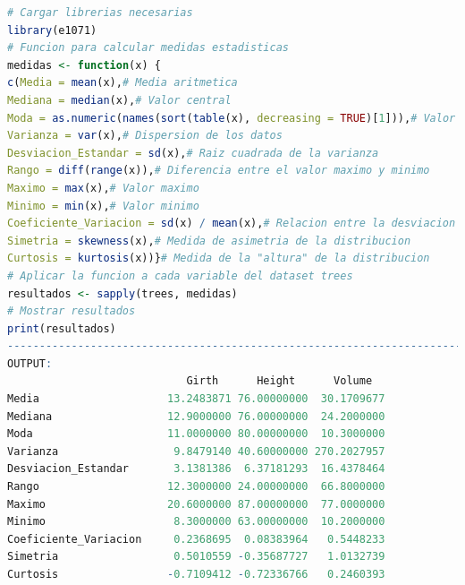 \documentclass{article}
\begin{document}
\begin{lstlisting}[language=R, caption=Medidas]
# Cargar librerias necesarias
library(e1071)  
# Funcion para calcular medidas estadisticas
medidas <- function(x) {
c(Media = mean(x),# Media aritmetica
Mediana = median(x),# Valor central
Moda = as.numeric(names(sort(table(x), decreasing = TRUE)[1])),# Valor mas frecuente
Varianza = var(x),# Dispersion de los datos
Desviacion_Estandar = sd(x),# Raiz cuadrada de la varianza
Rango = diff(range(x)),# Diferencia entre el valor maximo y minimo
Maximo = max(x),# Valor maximo
Minimo = min(x),# Valor minimo
Coeficiente_Variacion = sd(x) / mean(x),# Relacion entre la desviacion estandar y la media
Simetria = skewness(x),# Medida de asimetria de la distribucion
Curtosis = kurtosis(x))}# Medida de la "altura" de la distribucion  
# Aplicar la funcion a cada variable del dataset trees
resultados <- sapply(trees, medidas)
# Mostrar resultados
print(resultados)
------------------------------------------------------------------------------------
OUTPUT:
                            Girth      Height      Volume
Media                    13.2483871 76.00000000  30.1709677
Mediana                  12.9000000 76.00000000  24.2000000
Moda                     11.0000000 80.00000000  10.3000000
Varianza                  9.8479140 40.60000000 270.2027957
Desviacion_Estandar       3.1381386  6.37181293  16.4378464
Rango                    12.3000000 24.00000000  66.8000000
Maximo                   20.6000000 87.00000000  77.0000000
Minimo                    8.3000000 63.00000000  10.2000000
Coeficiente_Variacion     0.2368695  0.08383964   0.5448233
Simetria                  0.5010559 -0.35687727   1.0132739
Curtosis                 -0.7109412 -0.72336766   0.2460393
\end{lstlisting}
\end{document}
